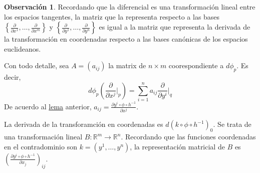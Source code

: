\documentclass[spanish]{book}
\theoremstyle{definition}
\newtheorem*{obs}{Observación}
\newcommand{\R}{\mathbb{R}}
\begin{document}
	\begin{obs}\label{obs:dif-mat}
		Recordando que la diferencial es una transformación lineal entre los espacios tangentes, la matriz que la representa respecto a las bases $\left\{ \frac{\partial}{\partial x^1},\ldots,\frac{\partial}{\partial x^m}\right\}$ y $\left\{\frac{\partial}{\partial y^1},\ldots,\frac{\partial}{\partial y^n}\right\}$ es igual a la matriz que representa la derivada de la transformación en coordenadas respecto a las bases canónicas de los espacios euclideanos.
		
		Con todo detalle, sea $A=(a_{ij})$ la matrix de $n\times m$ coorespondiente a $d\phi_p$. Es decir,
		\[d\phi_p\left(\frac{\partial}{\partial x^j}\Big|_p\right)=\sum_{i=1}^na_{ij}\frac{\partial}{\partial y^i}\Big|_q\]
		De acuerdo al \hyperref[lema:dif-coord]{lema} anterior, $a_{ij}=\frac{\partial y^i\circ\phi\circ h^{-1}}{\partial x^j}$.
		
		La derivada de la transforamción en coordenadas es $d(k\circ\phi\circ h^{-1})_0$. Se trata de una transformación lineal $B:\R^m\to\R^n$. Recordando que las funciones coordenadas en el contradominio son $k=(y^1,\ldots,y^n)$, la representación matricial de $B$ es $\left(\frac{\partial y^i\circ\phi\circ h^{-1}}{\partial x_j}\right)_{ij}$.
	\end{obs}
\end{document}
